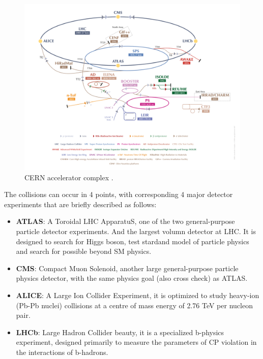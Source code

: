 \begin{figure}[!htb]
  \centering
  \includegraphics[width=1.0\textwidth]{figures/Detector/LHC_v2017.png}
  \caption{CERN accelerator complex \cite{Mobs:2197559}.}
  \label{cern_layout}
\end{figure}

The collisions can occur in 4 points, with corresponding 4 major detector experiments that are briefly described as follows:
\begin{itemize}
	\item \textbf{ATLAS}: A Toroidal LHC ApparatuS, one of the two general-purpose particle detector experiments. And the largest volumn detector at LHC. It is designed to search for Higgs boson, test stardand model of particle physics and search for possible beyond SM physics.
	\item \textbf{CMS}: Compact Muon Solenoid, another large general-purpose particle physics detector, with the same physics goal (also cross check) as ATLAS.
	\item \textbf{ALICE}: A Large Ion Collider Experiment, it is optimized to study heavy-ion (Pb-Pb nuclei) collisions at a centre of mass energy of 2.76 TeV per nucleon pair.
	\item \textbf{LHCb}: Large Hadron Collider beauty, it is a specialized b-physics experiment, designed primarily to measure the parameters of CP violation in the interactions of b-hadrons.
\end{itemize}


